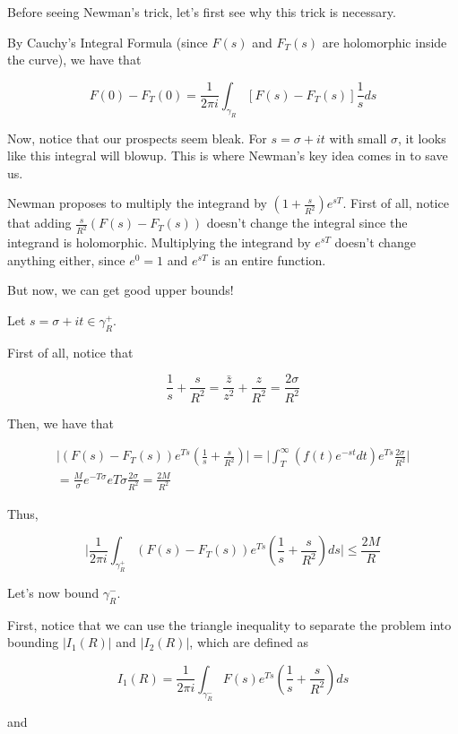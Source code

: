 \documentclass{article}
\theoremstyle{definition}
\begin{document}
Before seeing Newman's trick, let's first see why this trick is necessary.

By Cauchy's Integral Formula (since $ F(s) $ and $ F_{T}(s) $ are holomorphic inside the curve),
we have that 

\[ F(0) - F_{T}(0) = \frac{1}{2 \pi i} \int_{\gamma_{R}} [F(s) - F_{T}(s)] \frac{1}{s} ds \]

Now, notice that our prospects seem bleak. For $ s = \sigma + it $ with small $ \sigma $,
it looks like this integral will blowup. This is where Newman's key idea comes in to save us.

Newman proposes to multiply the integrand by $ (1 + \frac{s}{R^{2}}) e^{sT} $.
First of all, notice that adding $ \frac{s}{R^{2}}(F(s) - F_{T}(s)) $ doesn't change the integral
since the integrand is holomorphic. Multiplying the integrand by $ e^{sT} $ doesn't change anything either,
since $ e^{0} = 1 $ and $ e^{sT} $ is an entire function.

But now, we can get good upper bounds!

Let $ s = \sigma + it  \in \gamma_{R}^{+} $.

First of all, notice that 

\[ \frac{1}{s} + \frac{s}{R^{2}} = \frac{\bar{z}}{z^{2}} + \frac{z}{R^{2}} = \frac{2 \sigma}{R^{2}} \] 

Then, we have that

\begin{align*}
    \lvert (F(s) - F_{T}(s)) e^{Ts} (\frac{1}{s} + \frac{s}{R^{2}}) \rvert 
    = \lvert \int_{T}^{\infty} (f(t) e^{-st} dt) e^{Ts} \frac{2 \sigma}{R^{2}} \rvert \\
    = \frac{M}{\sigma} e^{-T\sigma} e{T \sigma}  \frac{2 \sigma}{R^{2}} = \frac{2M}{R^{2}}
\end{align*}

Thus, 

\[ \lvert \frac{1}{2 \pi i} \int_{\gamma_{R}^{+}} (F(s) - F_{T}(s)) e^{Ts} (\frac{1}{s} + \frac{s}{R^{2}}) ds \rvert \leq \frac{2M}{R} \]

Let's now bound $ \gamma_{R}^{-} $. 

First, notice that we can use the triangle inequality to separate the problem into bounding $ \lvert I_{1}(R) \rvert $ and
$ \lvert I_{2}(R) \rvert $, which are defined as

\[ I_{1}(R) = \frac{1}{2 \pi i} \int_{\gamma_{R}^{-}} F(s) e^{Ts} (\frac{1}{s} + \frac{s}{R^{2}}) ds \]

and
\end{document}
